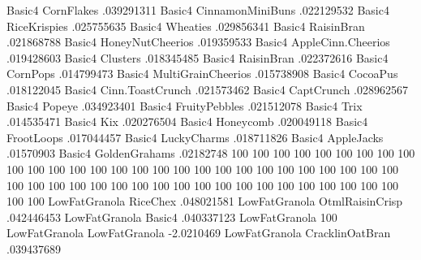Basic4	CornFlakes	.039291311
Basic4	CinnamonMiniBuns	.022129532
Basic4	RiceKrispies	.025755635
Basic4	Wheaties	.029856341
Basic4	RaisinBran	.021868788
Basic4	HoneyNutCheerios	.019359533
Basic4	AppleCinn.Cheerios	.019428603
Basic4	Clusters	.018345485
Basic4	RaisinBran	.022372616
Basic4	CornPops	.014799473
Basic4	MultiGrainCheerios	.015738908
Basic4	CocoaPus	.018122045
Basic4	Cinn.ToastCrunch	.021573462
Basic4	CaptCrunch	.028962567
Basic4	Popeye	.034923401
Basic4	FruityPebbles	.021512078
Basic4	Trix	.014535471
Basic4	Kix	.020276504
Basic4	Honeycomb	.020049118
Basic4	FrootLoops	.017044457
Basic4	LuckyCharms	.018711826
Basic4	AppleJacks	.01570903
Basic4	GoldenGrahams	.02182748
100%
100%
100%
100%
100%
100%
100%
100%
100%
100%
100%
100%
100%
100%
100%
100%
100%
100%
100%
100%
100%
100%
100%
100%
100%
100%
100%
100%
100%
100%
100%
100%
100%
100%
100%
100%
100%
100%
100%
100%
100%
100%
100%
100%
100%
100%
100%
100%
100%
LowFatGranola	RiceChex	.048021581
LowFatGranola	OtmlRaisinCrisp	.042446453
LowFatGranola	Basic4	.040337123
LowFatGranola	100%
LowFatGranola	LowFatGranola	-2.0210469
LowFatGranola	CracklinOatBran	.039437689

